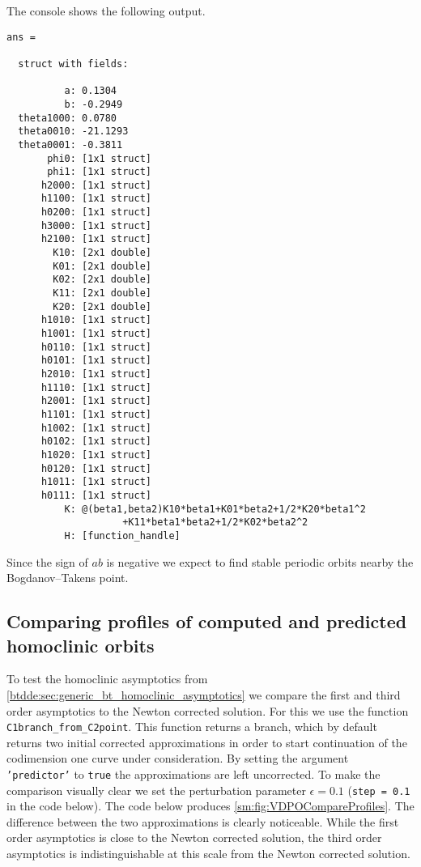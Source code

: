 The \MATLAB console shows the following output.
\begin{verbatim}
ans =

  struct with fields:

          a: 0.1304
          b: -0.2949
  theta1000: 0.0780
  theta0010: -21.1293
  theta0001: -0.3811
       phi0: [1x1 struct]
       phi1: [1x1 struct]
      h2000: [1x1 struct]
      h1100: [1x1 struct]
      h0200: [1x1 struct]
      h3000: [1x1 struct]
      h2100: [1x1 struct]
        K10: [2x1 double]
        K01: [2x1 double]
        K02: [2x1 double]
        K11: [2x1 double]
        K20: [2x1 double]
      h1010: [1x1 struct]
      h1001: [1x1 struct]
      h0110: [1x1 struct]
      h0101: [1x1 struct]
      h2010: [1x1 struct]
      h1110: [1x1 struct]
      h2001: [1x1 struct]
      h1101: [1x1 struct]
      h1002: [1x1 struct]
      h0102: [1x1 struct]
      h1020: [1x1 struct]
      h0120: [1x1 struct]
      h1011: [1x1 struct]
      h0111: [1x1 struct]
          K: @(beta1,beta2)K10*beta1+K01*beta2+1/2*K20*beta1^2
                    +K11*beta1*beta2+1/2*K02*beta2^2
          H: [function_handle]
\end{verbatim}
Since the sign of $ab$ is negative we expect to find stable periodic orbits nearby the 
Bogdanov--Takens point.

\subsection{Comparing profiles of computed and predicted homoclinic orbits}
To test the homoclinic asymptotics from
\cref{btdde:sec:generic_bt_homoclinic_asymptotics} we compare the first and third
order asymptotics to the Newton corrected solution. For this we use the 
function \texttt{C1branch_from_C2point}. This function returns a branch, which
by default returns two initial corrected approximations in order to start continuation of the
codimension one curve under consideration. By setting the argument
\texttt{'predictor'} to \texttt{true} the approximations are left uncorrected.
To make the comparison visually clear we set the perturbation parameter 
$\epsilon=0.1$ (\texttt{step = 0.1} in the code below).
The code below produces \cref{sm:fig:VDPOCompareProfiles}.
The difference between the two approximations is clearly noticeable. While
the first order asymptotics is close to the Newton corrected solution, the third
order asymptotics is indistinguishable at this scale from the Newton corrected
solution.
\inputminted[firstline=63, lastline=87]{MATLAB}{\pathToDDEBifToolDemos/vdpo_bt_transcritical/vanderPolOscillator.m}

